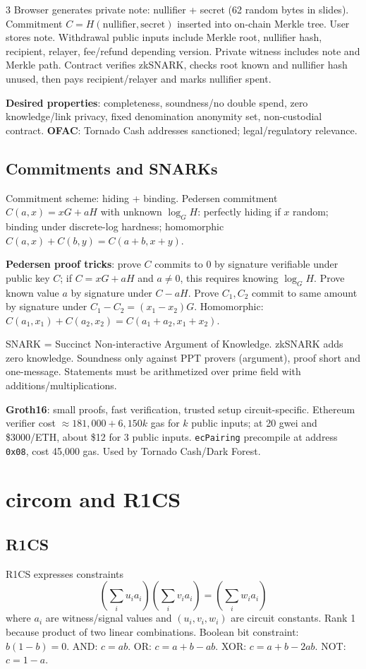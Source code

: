 \documentclass[8pt]{extarticle}
\newcommand{\term}[1]{\textbf{#1}}
\begin{document}
\begin{multicols*}{3}
Browser generates private note: nullifier + secret (62 random bytes in slides). Commitment $C=H(\mathrm{nullifier},\mathrm{secret})$ inserted into on-chain Merkle tree. User stores note. Withdrawal public inputs include Merkle root, nullifier hash, recipient, relayer, fee/refund depending version. Private witness includes note and Merkle path. Contract verifies zkSNARK, checks root known and nullifier hash unused, then pays recipient/relayer and marks nullifier spent.

\term{Desired properties}: completeness, soundness/no double spend, zero knowledge/link privacy, fixed denomination anonymity set, non-custodial contract. \term{OFAC}: Tornado Cash addresses sanctioned; legal/regulatory relevance.

\subsection{Commitments and SNARKs}
Commitment scheme: hiding + binding. Pedersen commitment $C(a,x)=xG+aH$ with unknown $\log_G H$: perfectly hiding if $x$ random; binding under discrete-log hardness; homomorphic $C(a,x)+C(b,y)=C(a+b,x+y)$.

\term{Pedersen proof tricks}: prove $C$ commits to 0 by signature verifiable under public key $C$; if $C=xG+aH$ and $a\ne0$, this requires knowing $\log_GH$. Prove known value $a$ by signature under $C-aH$. Prove $C_1,C_2$ commit to same amount by signature under $C_1-C_2=(x_1-x_2)G$. Homomorphic: $C(a_1,x_1)+C(a_2,x_2)=C(a_1+a_2,x_1+x_2)$.

SNARK = Succinct Non-interactive Argument of Knowledge. zkSNARK adds zero knowledge. Soundness only against PPT provers (argument), proof short and one-message. Statements must be arithmetized over prime field with additions/multiplications.

\term{Groth16}: small proofs, fast verification, trusted setup circuit-specific. Ethereum verifier cost $\approx181{,}000+6{,}150k$ gas for $k$ public inputs; at 20 gwei and \$3000/ETH, about \$12 for 3 public inputs. \texttt{ecPairing} precompile at address \texttt{0x08}, cost 45,000 gas. Used by Tornado Cash/Dark Forest.

\section{circom and R1CS}
\subsection{R1CS}
R1CS expresses constraints
\[
\left(\sum_i u_i a_i\right)\left(\sum_i v_i a_i\right)=\left(\sum_i w_i a_i\right)
\]
where $a_i$ are witness/signal values and $(u_i,v_i,w_i)$ are circuit constants. Rank 1 because product of two linear combinations. Boolean bit constraint: $b(1-b)=0$. AND: $c=ab$. OR: $c=a+b-ab$. XOR: $c=a+b-2ab$. NOT: $c=1-a$.


\end{multicols*}
\end{document}
